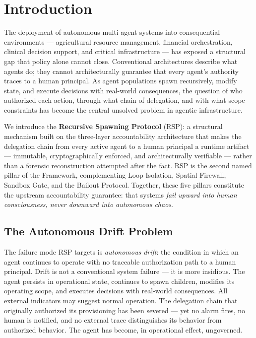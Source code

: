 \section{Introduction}
\label{sec:rs-intro}

The deployment of autonomous multi-agent systems into consequential environments — agricultural resource management, financial orchestration, clinical decision support, and critical infrastructure — has exposed a structural gap that policy alone cannot close. Conventional architectures describe what agents do; they cannot architecturally guarantee that every agent's authority traces to a human principal. As agent populations spawn recursively, modify state, and execute decisions with real-world consequences, the question of who authorized each action, through what chain of delegation, and with what scope constraints has become the central unsolved problem in agentic infrastructure.

We introduce the \textbf{Recursive Spawning Protocol} (RSP): a structural mechanism built on the \bxthree three-layer accountability architecture that makes the delegation chain from every active agent to a human principal a runtime artifact — immutable, cryptographically enforced, and architecturally verifiable — rather than a forensic reconstruction attempted after the fact. RSP is the second named pillar of the \bxthree Framework, complementing Loop Isolation, Spatial Firewall, Sandbox Gate, and the Bailout Protocol. Together, these five pillars constitute the upstream accountability guarantee: that \bxthree systems \emph{fail upward into human consciousness, never downward into autonomous chaos}.

\subsection{The Autonomous Drift Problem}

The failure mode RSP targets is \emph{autonomous drift}: the condition in which an agent continues to operate with no traceable authorization path to a human principal. Drift is not a conventional system failure — it is more insidious. The agent persists in operational state, continues to spawn children, modifies its operating scope, and executes decisions with real-world consequences. All external indicators may suggest normal operation. The delegation chain that originally authorized its provisioning has been severed — yet no alarm fires, no human is notified, and no external trace distinguishes its behavior from authorized behavior. The agent has become, in operational effect, ungoverned.

